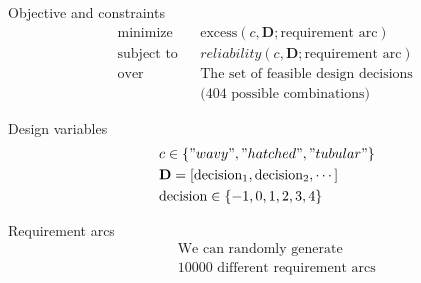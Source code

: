 \begin{frame}[t]
\begin{columns}[t]
		\begin{column}{.42\textwidth} %
			\vspace{-1.5em}
			\begin{alertblock}{Objective and constraints}
				\vspace{-1.5em}
				\begin{equation*}
					\begin{aligned}
							& {\text{minimize}}
							& & \text{excess}(c,\mathbf{D};\text{requirement arc})\\
							& \text{subject to}
							& & reliability(c,\mathbf{D};\text{requirement arc})\\
							& \text{over}
							& & \text{The set of feasible design decisions}\\
							& & & \text{(404 possible combinations)}
					\end{aligned}
				\end{equation*}
			\end{alertblock}
			\vspace{-0.5em}
			\begin{exampleblock}{Design variables}
				\vspace{-0.5em}
				\begin{equation*}
					\begin{aligned}
						& & & c \in \left\{"wavy","hatched","tubular"\right\}\\
						& & & \mathbf{D} = \left[\text{decision}_1,\text{decision}_2,\cdots\right]\\
						& & & \text{decision} \in \left\{-1,0,1,2,3,4\right\}\\
					\end{aligned}
				\end{equation*}
			\end{exampleblock}
			\vspace{-0.5em}
			\begin{block}{Requirement arcs}
				\vspace{-0.5em}
				\begin{equation*}
					\begin{aligned}
						& & & \text{We can randomly generate}\\
						& & & \text{10000 different requirement arcs}
					\end{aligned}
				\end{equation*}
			\end{block}
		\end{column}


\end{columns}
\end{frame}
